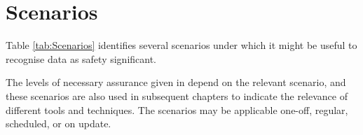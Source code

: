 %
%
\chapter{Scenarios} \label{bkm:scenario}


Table \ref{tab:Scenarios} identifies several scenarios under which it might be useful to recognise data as safety significant.

The levels of necessary assurance given in 
depend on the relevant scenario, and these scenarios
are also used in subsequent chapters to indicate the relevance of
different tools and techniques. 
The scenarios may be applicable one-off, regular, scheduled, or on update.

